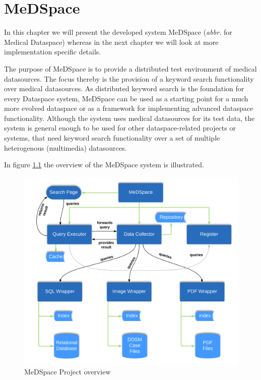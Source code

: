 \chapter{MeDSpace}

In this chapter we will present the developed system MeDSpace (\textit{abbr.} for Medical Dataspace) whereas in the next chapter we will look at more implementation specific details.

The purpose of MeDSpace is to provide a distributed test environment of medical datasources. The focus thereby is the provision of a keyword search functionality over medical datasources. 
As distributed keyword search is the foundation for every Dataspace system, MeDSpace can be used as a starting point for a much more evolved dataspace or as a framework for implementing advanced dataspace functionality.
Although the system uses medical datasources for its test data, the system is general enough to be used for other dataspace-related projects or systems, that need keyword search functionality over a set of multiple heterogenous (multimedia) datasources. 

In figure \ref{MeDSpaceOverview} the overview of the MeDSpace system is illustrated.
\begin{figure}[H]
	\begin{center}
		\includegraphics[scale=0.145]{figures/MeDSpace-Overview.png}
	\end{center}
	\caption{MeDSpace Project overview}
	\label{MeDSpaceOverview}
\end{figure} 

